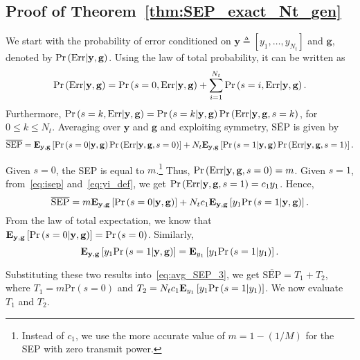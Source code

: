 \documentclass[12pt,draftcls,peerreview,onecolumn]{IEEEtran}
\newcommand{\brac}[1]{\left({#1}\right)}
\newcommand{\define}{\triangleq}
\newcommand{\explow}[2]{{\bf{E}}_{#1}\left[{#2}\right]}
\newcommand{\prob}[1]{\text{Pr}\brac{#1}}
\newcommand{\given}{\arrowvert}
\newcommand{\SEP}{\text{SEP}}
\newcommand{\y}{\mathbf{y}}
\newcommand{\nx}{{0}}
\newcommand{\Err}{{\text{Err}}}
\newcommand{\termone}{T_1}
\newcommand{\termtwo}{T_2}
\newcommand{\Nt}{{N_t}}
\newcommand{\puch}{g}
\newcommand{\g}{\mathbf{\puch}}
\newcommand{\cone}{c_{1}}
\newcommand{\m}{\cone}
\newcommand{\yk}[1]{y_{#1}}
\newcommand{\zerosep}{m}
\newcommand{\avgSEP}{\overline{\SEP}}
\begin{document}
\subsection{Proof of Theorem~\ref{thm:SEP_exact_Nt_gen}}
\label{proof:SEP_exact_Nt_gen}
We start with the probability of error conditioned on $\y \define [\yk{1},\ldots,\yk{\Nt}]$  and $\g$, denoted by $\prob{\Err \given \y,\g}$. Using the law of total probability, it can be written as
%
\begin{equation}
\prob{\Err \given \y,\g} =  \prob{s=\nx,\Err\given\y,\g} + \sum_{i=1}^{\Nt}\prob{s=i,\Err\given\y,\g}.
\label{eq:Perr_all_h}
\end{equation}
%
Furthermore, $\prob{s=k,\Err\given\y,\g}=\prob{s=k\given\y,\g}\prob{\Err\given\y,\g,s=k}$, for $0\leq k \leq \Nt$. Averaging over $\y$ and $\g$ and exploiting symmetry, $\avgSEP$ is given by
\begin{multline*}
\label{eq:avg_SEP_1}
 \avgSEP = \explow{\y,\g}{\prob{s=\nx\given\y,\g}\prob{\Err\given\y,\g,s=\nx}} + \Nt\explow{\y,\g}{\prob{s=1\given\y,\g}\prob{\Err\given\y,\g,s=1}}. 
\end{multline*}

Given $s=0$, the SEP is equal to $\zerosep$.\footnote{Instead of $c_1$, we use the more accurate value of $\zerosep=1-\left( 1/M\right) $ for the SEP with zero transmit power.}  Thus, $\prob{\Err\given\y,\g,s=\nx}=\zerosep$. Given $s=1$, from~\eqref{eq:isep} and~\eqref{eq:yi_def}, we get $\prob{\Err\given\y,\g,s=1}=\m \yk{1}$. Hence,
\begin{equation}
\label{eq:avg_SEP_3}
\avgSEP  = \zerosep \explow{\y,\g}{\prob{s=\nx\given\y,\g}} + \Nt\m\explow{\y,\g}{\yk{1}\prob{s=1\given\y,\g}}.
\end{equation}
From the law of total expectation, we know that $\explow{\y,\g}{\prob{s=\nx\given\y,\g}} = \prob{s = 0}$.
Similarly, 
\begin{equation}
\label{eq:avg_sep_3_one}
\explow{\y,\g}{\yk{1}\prob{s = 1\given \y,\g} } = \explow{\yk{1}}{\yk{1} \prob{s = 1\given \yk{1}}  }.
\end{equation}

Substituting these  two results into~\eqref{eq:avg_SEP_3}, we get
%
$\avgSEP  = \termone + \termtwo$,
%
where $\termone=\zerosep \prob{s = 0}$ and $\termtwo=\Nt\m \explow{\yk{1}}{ \yk{1}\prob{s = 1\given \yk{1}}}$. We now evaluate $\termone$ and $\termtwo$.
\end{document}
